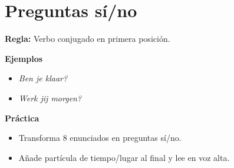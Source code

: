 \section{Preguntas sí/no}
\textbf{Regla:} Verbo conjugado en primera posición.

\textbf{Ejemplos}
\begin{itemize}[leftmargin=*]
  \item \textit{Ben je klaar?}
  \item \textit{Werk jij morgen?}
\end{itemize}

\textbf{Práctica}
\begin{itemize}[leftmargin=*]
  \item Transforma 8 enunciados en preguntas sí/no.
  \item Añade partícula de tiempo/lugar al final y lee en voz alta.
\end{itemize}
